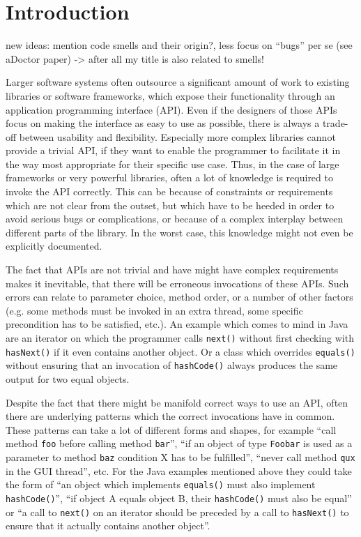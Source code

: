 \chapter{Introduction}\label{chapter:introduction}

new ideas:
    mention code smells and their origin?, less focus on ``bugs'' per se (see aDoctor paper) -> after all my title is also related to smells!

Larger software systems often outsource a significant amount of work to existing libraries or software frameworks, which expose their functionality through an application programming interface (API).
Even if the designers of those APIs focus on making the interface as easy to use as possible, there is always a trade-off between usability and flexibility.
Especially more complex libraries cannot provide a trivial API, if they want to enable the programmer to facilitate it in the way most appropriate for their specific use case.
Thus, in the case of large frameworks or very powerful libraries, often a lot of knowledge is required to invoke the API correctly.
This can be because of constraints or requirements which are not clear from the outset, but which have to be heeded in order to avoid serious bugs or complications, or because of a complex interplay between different parts of the library.
In the worst case, this knowledge might not even be explicitly documented.

The fact that APIs are not trivial and have might have complex requirements makes it inevitable, that there will be erroneous invocations of these APIs.
Such errors can relate to parameter choice, method order, or a number of other factors (e.g. some methods must be invoked in an extra thread, some specific precondition has to be satisfied, etc.).
An example which comes to mind in Java are an iterator on which the programmer calls \texttt{next()} without first checking with \texttt{hasNext()} if it even contains another object.
Or a class which overrides \texttt{equals()} without ensuring that an invocation of \texttt{hashCode()} always produces the same output for two equal objects.

Despite the fact that there might be manifold correct ways to use an API, often there are underlying patterns which the correct invocations have in common.
These patterns can take a lot of different forms and shapes, for example ``call method \texttt{foo} before calling method \texttt{bar}'', ``if an object of type \texttt{Foobar} is used as a parameter to method \texttt{baz} condition X has to be fulfilled'', ``never call method \texttt{qux} in the GUI thread'', etc.
For the Java examples mentioned above they could take the form of ``an object which implements \texttt{equals()} must also implement \texttt{hashCode()}'', ``if object A equals object B, their \texttt{hashCode()} must also be equal'' or ``a call to \texttt{next()} on an iterator should be preceded by a call to \texttt{hasNext()} to ensure that it actually contains another object''.

